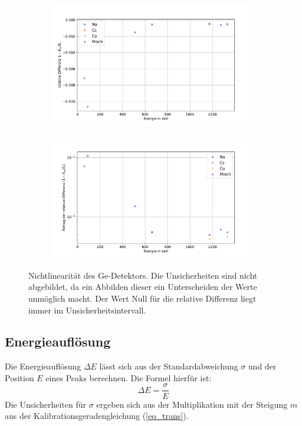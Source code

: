 \documentclass[
	a4paper,
	12pt,
	pagesize,
	ngerman
]{scrartcl}
\begin{document}
\begin{figure}[H]
		\centering
		\begin{subfigure}[t]{0.8\textwidth}
			\centering
			\includegraphics[width= \linewidth]{img/diff_ge.pdf}
		\end{subfigure}
		\begin{subfigure}[t]{0.8\textwidth}
			\centering
			\includegraphics[width= \linewidth]{img/diff_ge_log.pdf}
		\end{subfigure}
		\caption{Nichtlinearität des Ge-Detektors.
		Die Unsicherheiten sind nicht abgebildet, da ein Abbilden dieser ein Unterscheiden der Werte unmöglich macht.
		Der Wert Null für die relative Differenz liegt immer im Unsicherheitsintervall.
		}
		\label{fg_diff_ge}
	\end{figure}
\subsection{Energieauflösung}
Die Energieauflösung $\Delta E$ lässt sich aus der Standardabweichung $\sigma$ und der Position $E$ eines Peaks berechnen.
Die Formel hierfür ist:
\begin{equation}
	\Delta E = \frac{\sigma}{E}
\end{equation}
Die Unsicherheiten für $\sigma$ ergeben sich aus der Multiplikation mit der Steigung $m$ aus der Kalibrationsgeradengleichung (\ref{eq_trans}).
\end{document}
